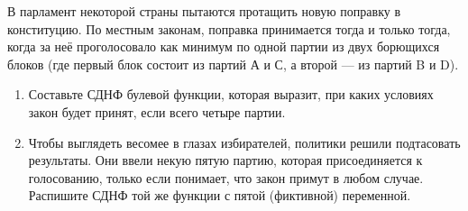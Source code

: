 \question
В парламент некоторой страны пытаются протащить новую поправку в конституцию. По местным законам, поправка принимается тогда и только тогда, когда за неё проголосовало как минимум по одной партии из двух борющихся блоков (где первый блок состоит из партий А и С, а второй — из партий B и D).

\begin{enumerate}
    \item Составьте СДНФ булевой функции, которая выразит, при каких условиях закон будет принят, если всего четыре партии.
    \item Чтобы выглядеть весомее в глазах избирателей, политики решили подтасовать результаты.  Они ввели некую пятую партию, которая присоединяется к голосованию, только если понимает, что закон примут в любом случае. Распишите СДНФ той же функции с пятой (фиктивной) переменной.
\end{enumerate}

